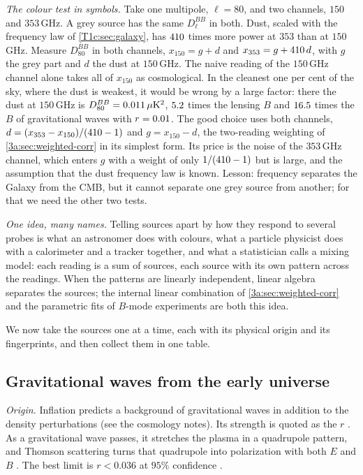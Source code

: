 \emph{The colour test in symbols.} Take one multipole, $\ell=80$, and two channels, $150$ and $353\,$GHz. A grey source has the same $D_\ell^{BB}$ in both. Dust, scaled with the frequency law of \cref{T1c:sec:galaxy}, has $410$ times more power at $353$ than at $150\,$GHz. Measure $D_{80}^{BB}$ in both channels, $x_{150}=g+d$ and $x_{353}=g+410\,d$, with $g$ the grey part and $d$ the dust at $150\,$GHz. The naive reading of the $150\,$GHz channel alone takes all of $x_{150}$ as cosmological. In the cleanest one per cent of the sky, where the dust is weakest, it would be wrong by a large factor: there the dust at $150\,$GHz is $D_{80}^{BB}=0.011\,\mu\mathrm K^2$, $5.2$ times the lensing $B$ and $16.5$ times the $B$ of gravitational waves with $r=0.01$. The good choice uses both channels, $d=(x_{353}-x_{150})/(410-1)$ and $g=x_{150}-d$, the two-reading weighting of \cref{3a:sec:weighted-corr} in its simplest form. Its price is the noise of the $353\,$GHz channel, which enters $g$ with a weight of only $1/(410-1)$ but is large, and the assumption that the dust frequency law is known. Lesson: frequency separates the Galaxy from the CMB, but it cannot separate one grey source from another; for that we need the other two tests.

\emph{One idea, many names.} Telling sources apart by how they respond to several probes is what an astronomer does with colours, what a particle physicist does with a calorimeter and a tracker together, and what a statistician calls a mixing model: each reading is a sum of sources, each source with its own pattern across the readings. When the patterns are linearly independent, linear algebra separates the sources; the internal linear combination of \cref{3a:sec:weighted-corr} and the parametric fits of $B$-mode experiments are both this idea.

We now take the sources one at a time, each with its physical origin and its fingerprints, and then collect them in one table.

\subsection{Gravitational waves from the early universe}
\label{T1c:sec:gw}

\emph{Origin.} Inflation predicts a background of gravitational waves in addition to the density perturbations (see the cosmology notes). Its strength is quoted as the  $r$ . As a gravitational wave passes, it stretches the plasma in a quadrupole pattern, and Thomson scattering turns that quadrupole into polarization with both $E$ and $B$ \cite{SeljakZaldarriaga1997,Kamionkowski1997}. The best limit is $r<0.036$ at $95\%$ confidence \cite{BICEPKeck2021}.

